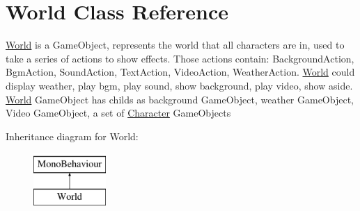 \hypertarget{class_world}{}\section{World Class Reference}
\label{class_world}


\hyperlink{class_world}{World} is a Game\+Object, represents the world that all characters are in, used to take a series of actions to show effects. Those actions contain\+: Background\+Action, Bgm\+Action, Sound\+Action, Text\+Action, Video\+Action, Weather\+Action. \hyperlink{class_world}{World} could display weather, play bgm, play sound, show background, play video, show aside. \hyperlink{class_world}{World} Game\+Object has childs as background Game\+Object, weather Game\+Object, Video Game\+Object, a set of \hyperlink{class_character}{Character} Game\+Objects  


Inheritance diagram for World\+:\begin{figure}[H]
\begin{center}
\leavevmode
\includegraphics[height=2.000000cm]{class_world}
\end{center}
\end{figure}
